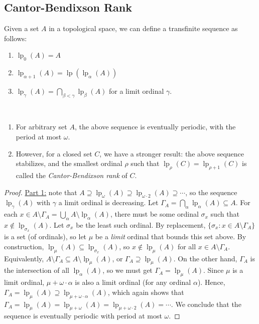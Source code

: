 \documentclass{treatise}
\begin{document}
\begin{shaded}
\section{Cantor-Bendixson Rank}
Given a set $A$ in a topological space, we can define a transfinite sequence as follows:
\begin{enumerate}
    \item $\operatorname{lp}_0(A) = A$
    \item $\operatorname{lp}_{\alpha + 1}(A) = \operatorname{lp}(\operatorname{lp}_\alpha(A))$
    \item $\operatorname{lp}_\gamma (A) = \bigcap_{\beta < \gamma} \operatorname{lp}_\beta (A)$ for a limit ordinal $\gamma$.
\end{enumerate}
\begin{theorem} \ 
\begin{enumerate}
    \item For arbitrary set $A$, the above sequence is eventually periodic, with the period at most $\omega$.
    \item However, for a closed set $C$, we have a stronger result: the above sequence stabilizes, and the smallest ordinal $\rho$ such that $\operatorname{lp}_\rho (C) = \operatorname{lp}_{\rho + 1} (C)$ is called the \emph{Cantor-Bendixson rank} of $C$.
\end{enumerate}
\end{theorem}
\begin{proof}
\underline{Part 1:} note that $A \supseteq \operatorname{lp}_\omega (A) \supseteq \operatorname{lp}_{\omega \cdot 2} (A) \supseteq \cdots$, so the sequence $\operatorname{lp}_\gamma(A)$ with $\gamma$ a limit ordinal is decreasing. Let $\Gamma_A = \bigcap_{\alpha} \operatorname{lp}_\alpha (A) \subseteq A$. For each $x \in A \setminus \Gamma_A = \bigcup_\alpha A \setminus \operatorname{lp}_\alpha(A)$, there must be some ordinal $\sigma_x$ such that $x \notin \operatorname{lp}_{\sigma_x}(A)$. Let $\sigma_x$ be the least such ordinal. By replacement, $\{ \sigma_x : x \in A \setminus \Gamma_A \}$ is a set (of ordinals), so let $\mu$ be a \textit{limit} ordinal that bounds this set above. By construction, $\operatorname{lp}_\mu(A) \subseteq \operatorname{lp}_{\sigma_x}(A)$, so $x \notin \operatorname{lp}_\mu(A)$ for all $x \in A \setminus \Gamma_A$. Equivalently, $A \setminus \Gamma_A \subseteq A \setminus \operatorname{lp}_\mu(A)$, or $\Gamma_A \supseteq \operatorname{lp}_\mu(A)$. On the other hand, $\Gamma_A$ is the intersection of all $\operatorname{lp}_\alpha(A)$, so we must get $\Gamma_A = \operatorname{lp}_\mu(A)$. Since $\mu$ is a limit ordinal, $\mu + \omega \cdot \alpha$ is also a limit ordinal (for any ordinal $\alpha$). Hence, $\Gamma_A = \operatorname{lp}_\mu(A) \supseteq \operatorname{lp}_{\mu + \omega \cdot \alpha} (A)$, which again shows that $\Gamma_A = \operatorname{lp}_{\mu}(A) = \operatorname{lp}_{\mu + \omega}(A) = \operatorname{lp}_{\mu + \omega \cdot 2}(A) = \cdots$. We conclude that the sequence is eventually periodic with period at most $\omega$.

\end{proof}
\end{shaded}
\end{document}
